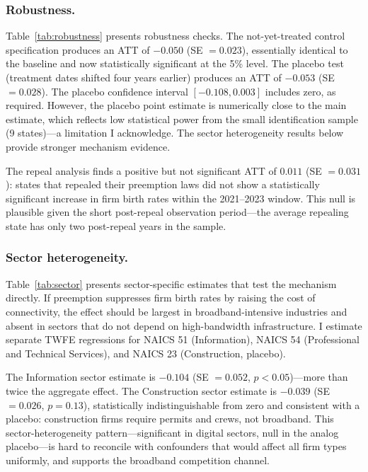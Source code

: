 \documentclass[12pt]{article}
\begin{document}


\subsubsection*{Robustness.} Table~\ref{tab:robustness} presents robustness checks. The not-yet-treated control specification produces an ATT of $-0.050$ (SE $= 0.023$), essentially identical to the baseline and now statistically significant at the 5\% level. The placebo test (treatment dates shifted four years earlier) produces an ATT of $-0.053$ (SE $= 0.028$). The placebo confidence interval $[-0.108, 0.003]$ includes zero, as required. However, the placebo point estimate is numerically close to the main estimate, which reflects low statistical power from the small identification sample (9 states)---a limitation I acknowledge. The sector heterogeneity results below provide stronger mechanism evidence.

The repeal analysis finds a positive but not significant ATT of $0.011$ (SE $= 0.031$): states that repealed their preemption laws did not show a statistically significant increase in firm birth rates within the 2021--2023 window. This null is plausible given the short post-repeal observation period---the average repealing state has only two post-repeal years in the sample.



\subsubsection*{Sector heterogeneity.} Table~\ref{tab:sector} presents sector-specific estimates that test the mechanism directly. If preemption suppresses firm birth rates by raising the cost of connectivity, the effect should be largest in broadband-intensive industries and absent in sectors that do not depend on high-bandwidth infrastructure. I estimate separate TWFE regressions for NAICS 51 (Information), NAICS 54 (Professional and Technical Services), and NAICS 23 (Construction, placebo).

The Information sector estimate is $-0.104$ (SE $= 0.052$, $p < 0.05$)---more than twice the aggregate effect. The Construction sector estimate is $-0.039$ (SE $= 0.026$, $p = 0.13$), statistically indistinguishable from zero and consistent with a placebo: construction firms require permits and crews, not broadband. This sector-heterogeneity pattern---significant in digital sectors, null in the analog placebo---is hard to reconcile with confounders that would affect all firm types uniformly, and supports the broadband competition channel.
\end{document}
